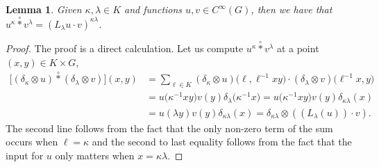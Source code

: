 \documentclass[pdftex]{sigma}
\numberwithin{equation}{section}
\newtheorem{Lemma}[Theorem]{Lemma}
\theoremstyle{definition}
\newcommand{\starcirc}{\overset{\circ}{*}}
\newcommand{\inv}{^{-1}}
\begin{document}
\begin{Lemma}\label{lemma:compute.star.circ}
  Given $ \kappa, \lambda \in K $ and functions $ u, v \in C^\infty(G) $, then we have that
  $u^\kappa \starcirc v^\lambda = ( L_{\lambda} u \cdot v )^{\kappa \lambda}$.
\end{Lemma}
\begin{proof}
The proof is a direct calculation. Let us compute $ u^\kappa \starcirc v^\lambda $ at a point $ (x,y ) \in K \times G $,
\begin{align*}
  \big[ (\delta_{\kappa} \otimes u ) \starcirc (\delta_{\lambda} \otimes v ) \big] (x,y) &=
  \sum_{\ell \in K } ( \delta_\kappa \otimes u) \big(\ell, \ell\inv x y\big) \cdot (\delta_{\lambda} \otimes v )\big(\ell\inv x, y\big) \\
  &= u\big(\kappa\inv x y \big) v(y) \delta_{\lambda}\big(\kappa\inv x\big) = u\big(\kappa\inv x y \big) v(y) \delta_{\kappa \lambda}(x) \\
  &= u(\lambda y ) v(y) \delta_{\kappa \lambda}(x)
  = \delta_{\kappa \lambda} \otimes (( L_{\lambda}(u)) \cdot v).
\end{align*}
The second line follows from the fact that the only non-zero term of the sum occurs when $ \ell = \kappa $ and the second to last equality follows from the fact that the input for $ u $ only matters when $ x = \kappa \lambda $.
\end{proof}
\end{document}
